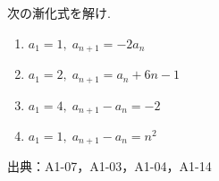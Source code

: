 \documentclass{ltjsarticle}
\begin{document}
次の漸化式を解け.


\begin{enumerate}[label=(\arabic*)]

  \item \(a_1=1,\;a_{n+1}=-2a_n\)

  \item \(a_1=2,\;a_{n+1}=a_n+6n-1\)

  \item \(a_1=4,\;a_{n+1}-a_n=-2\)

  \item \(a_1=1,\;a_{n+1}-a_n=n^2\)

\end{enumerate}

\bigskip
\noindent 出典：A1-07，A1-03，A1-04，A1-14
\end{document}
